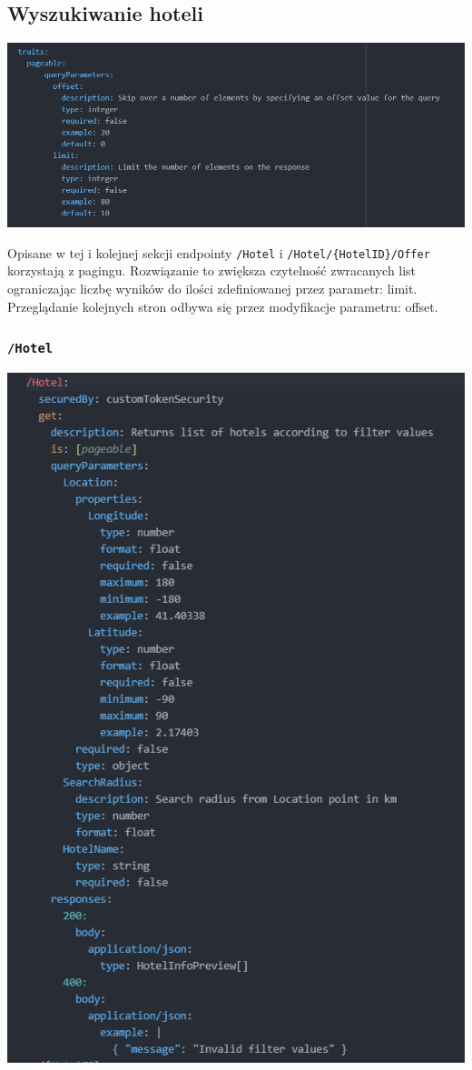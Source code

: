 \documentclass{article}
\begin{document}
\subsection{Wyszukiwanie hoteli}

    \includegraphics[width=\linewidth]{Oferta+Hotel-Raml/pageable.png}

 Opisane w tej i kolejnej sekcji endpointy \texttt{/Hotel} i \texttt{/Hotel/\{HotelID\}/Offer} korzystają z pagingu. Rozwiązanie to zwiększa czytelność zwracanych list ograniczając liczbę wyników do ilości zdefiniowanej przez parametr: limit. Przeglądanie kolejnych stron odbywa się przez modyfikacje parametru: offset.
\subsubsection{\texttt{/Hotel}}
\begin{center}
    \includegraphics[scale=1.3]{Oferta+Hotel-Raml/Hotel_Raml.png}
\end{center}
\end{document}
